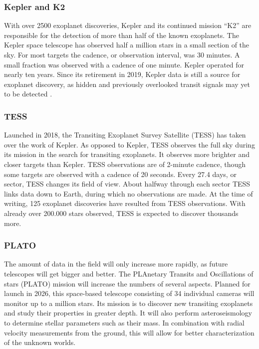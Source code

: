 
\subsubsection{Kepler and K2}
With over 2500 exoplanet discoveries, Kepler and its continued mission ``K2'' are responsible for the detection of more than half of the known exoplanets. The Kepler space telescope has observed half a million stars in a small section of the sky. For most targets the cadence, or observation interval, was 30 minutes. A small fraction was observed with a cadence of one minute. Kepler operated for nearly ten years. Since its retirement in 2019, Kepler data is still a source for exoplanet discovery, as hidden and previously overlooked transit signals may yet to be detected \citep{hedges2019four}.

\subsubsection{TESS}
Launched in 2018, the Transiting Exoplanet Survey Satellite (TESS) has taken over the work of Kepler. As opposed to Kepler, TESS observes the full sky during its mission in the search for transiting exoplanets. It observes more brighter and closer targets than Kepler. TESS observations are of 2-minute cadence, though some targets are observed with a cadence of 20 seconds. Every 27.4 days, or sector, TESS changes its field of view. About halfway through each sector TESS links data down to Earth, during which no observations are made. At the time of writing, 125 exoplanet discoveries have resulted from TESS observations. With already over 200.000 stars observed, TESS is expected to discover thousands more.

\subsubsection{PLATO}
The amount of data in the field will only increase more rapidly, as future telescopes will get bigger and better. The PLAnetary Transits and Oscillations of stars (PLATO) mission will increase the numbers of several aspects. Planned for launch in 2026, this space-based telescope consisting of 34  individual cameras will monitor up to a million stars. Its mission is to discover new transiting exoplanets and study their properties in greater depth. It will also perform asteroseismology to determine stellar parameters such as their mass. In combination with radial velocity measurements from the ground, this will allow for better characterization of the unknown worlds.